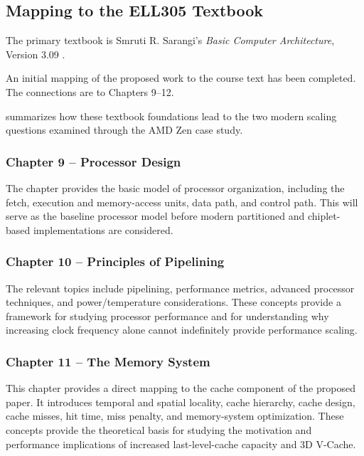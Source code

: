 \subsection{Mapping to the ELL305 Textbook}
\label{sec:textbook}

The primary textbook is Smruti R. Sarangi's \emph{Basic Computer Architecture}, Version 3.09 \cite{sarangi2025basic}.

An initial mapping of the proposed work to the course text has been completed. The connections are to Chapters 9--12.

 summarizes how these textbook foundations lead to the two modern scaling questions examined through the AMD Zen case study.



\subsubsection{Chapter 9 -- Processor Design}

The chapter provides the basic model of processor organization, including the fetch, execution and memory-access units, data path, and control path. This will serve as the baseline processor model before modern partitioned and chiplet-based implementations are considered.

\subsubsection{Chapter 10 -- Principles of Pipelining}

The relevant topics include pipelining, performance metrics, advanced processor techniques, and power/temperature considerations. These concepts provide a framework for studying processor performance and for understanding why increasing clock frequency alone cannot indefinitely provide performance scaling.

\subsubsection{Chapter 11 -- The Memory System}

This chapter provides a direct mapping to the cache component of the proposed paper. It introduces temporal and spatial locality, cache hierarchy, cache design, cache misses, hit time, miss penalty, and memory-system optimization. These concepts provide the theoretical basis for studying the motivation and performance implications of increased last-level-cache capacity and 3D V-Cache.

